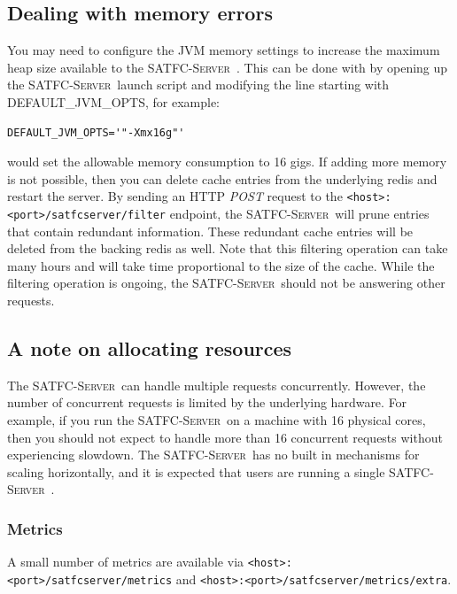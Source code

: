 \documentclass[
10pt, %
letterpaper, %
oneside, %
headinclude,footinclude, %
BCOR5mm, %
needspace, %
]{scrartcl}
\newcommand{\SATFCServer}{\textsc{SATFC-Server}~}
\begin{document}
\subsection{Dealing with memory errors}
You may need to configure the JVM memory settings to increase the maximum heap size available to the \SATFCServer. This can be done with by opening up the \SATFCServer launch script and modifying the line starting with DEFAULT\_JVM\_OPTS, for example:
\begin{lstlisting}[style=Bash]
DEFAULT_JVM_OPTS='"-Xmx16g"'
\end{lstlisting}
would set the allowable memory consumption to 16 gigs. If adding more memory is not possible, then you can delete cache entries from the underlying redis and restart the server. By sending an HTTP \emph{POST} request to the \texttt{<host>:<port>/satfcserver/filter} endpoint, the \SATFCServer will prune entries that contain redundant information. These redundant cache entries will be deleted from the backing redis as well. Note that this filtering operation can take many hours and will take time proportional to the size of the cache. While the filtering operation is ongoing, the \SATFCServer should not be answering other requests.

\subsection{A note on allocating resources}
The \SATFCServer can handle multiple requests concurrently. However, the number of concurrent requests is limited by the underlying hardware. For example, if you run the \SATFCServer on a machine with 16 physical cores, then you should not expect to handle more than 16 concurrent requests without experiencing slowdown. The \SATFCServer has no built in mechanisms for scaling horizontally, and it is expected that users are running a single \SATFCServer.

\subsubsection{Metrics}
A small number of metrics are available via \texttt{<host>:<port>/satfcserver/metrics} and \texttt{<host>:<port>/satfcserver/metrics/extra}.
\end{document}
